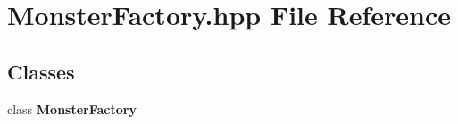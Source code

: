 \section{Monster\-Factory.\-hpp File Reference}
\label{_monster_factory_8hpp}
\subsection*{Classes}
\begin{DoxyCompactItemize}
\item 
class {\bf Monster\-Factory}
\end{DoxyCompactItemize}
